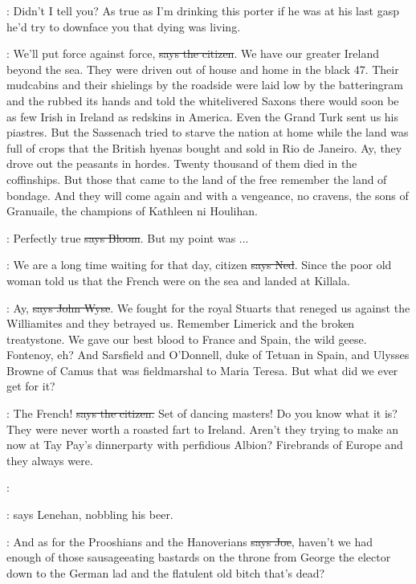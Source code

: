 \Nq:
Didn't I tell you? As true as I'm drinking this porter if he was at his
last gasp he'd try to downface you that dying was living.

\citizen:
We'll put force against force, \sout{says the citizen}.
We have our greater
Ireland beyond the sea. They were driven out of house and home in the
black 47. Their mudcabins and their shielings by the roadside were laid
low by the batteringram and the  rubbed its hands and told the
whitelivered Saxons there would soon be as few Irish in Ireland as
redskins in America. Even the Grand Turk sent us his piastres. But the
Sassenach tried to starve the nation at home while the land was full of
crops that the British hyenas bought and sold in Rio de Janeiro. Ay, they
drove out the peasants in hordes. Twenty thousand of them died in the
coffinships. But those that came to the land of the free remember the
land of bondage. And they will come again and with a vengeance, no
cravens, the sons of Granuaile, the champions of Kathleen ni Houlihan.

\Bloom:
Perfectly true \sout{says Bloom}.
But my point was ...

\lambert:
We are a long time waiting for that day,
citizen \sout{says Ned}. Since the
poor old woman told us that the French were on the sea and landed at
Killala.

\johnwyse:
Ay, \sout{says John Wyse}.
We fought for the royal Stuarts that reneged us
against the Williamites and they betrayed us. Remember Limerick and the
broken treatystone. We gave our best blood to France and Spain, the wild
geese. Fontenoy, eh? And Sarsfield and O'Donnell, duke of Tetuan in
Spain, and Ulysses Browne of Camus that was fieldmarshal to Maria Teresa.
But what did we ever get for it?

\citizen:
The French! \sout{says the citizen.}
Set of dancing masters! Do you know what
it is? They were never worth a roasted fart to Ireland. Aren't they
trying to make an  now at Tay Pay's dinnerparty with
perfidious Albion? Firebrands of Europe and they always were.

\lenehan:

\Nq:
says Lenehan, nobbling his beer.

\joe:
And as for the Prooshians and the Hanoverians
\sout{says Joe}, haven't we had
enough of those sausageeating bastards on the throne from George the
elector down to the German lad and the flatulent old bitch that's dead?

